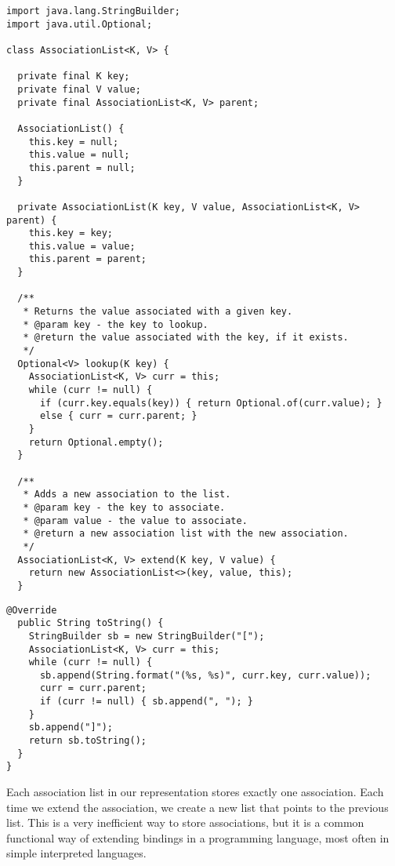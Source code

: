 \begin{lstlisting}[language=MyJavaNF]
import java.lang.StringBuilder;
import java.util.Optional;

class AssociationList<K, V> {
  
  private final K key;
  private final V value;
  private final AssociationList<K, V> parent;
  
  AssociationList() {
    this.key = null;
    this.value = null;
    this.parent = null;
  }

  private AssociationList(K key, V value, AssociationList<K, V> parent) {
    this.key = key;
    this.value = value;
    this.parent = parent;
  }
  
  /**
   * Returns the value associated with a given key.
   * @param key - the key to lookup.
   * @return the value associated with the key, if it exists.
   */
  Optional<V> lookup(K key) {
    AssociationList<K, V> curr = this;
    while (curr != null) {
      if (curr.key.equals(key)) { return Optional.of(curr.value); } 
      else { curr = curr.parent; }
    }
    return Optional.empty();
  }
  
  /**
   * Adds a new association to the list.
   * @param key - the key to associate.
   * @param value - the value to associate.
   * @return a new association list with the new association.
   */
  AssociationList<K, V> extend(K key, V value) {
    return new AssociationList<>(key, value, this);
  }
\end{lstlisting}
\begin{lstlisting}[language=MyJavaNF]
  @Override
  public String toString() {
    StringBuilder sb = new StringBuilder("[");
    AssociationList<K, V> curr = this;
    while (curr != null) {
      sb.append(String.format("(%s, %s)", curr.key, curr.value));
      curr = curr.parent;
      if (curr != null) { sb.append(", "); }
    }
    sb.append("]");
    return sb.toString();
  }
}
\end{lstlisting}
Each association list in our representation stores exactly one association. Each time we extend the association, we create a new list that points to the previous list. This is a very inefficient way to store associations, but it is a common functional way of extending bindings in a programming language, most often in simple interpreted languages.